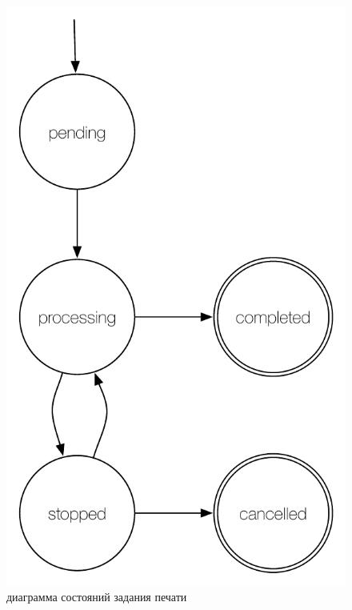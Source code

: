 \documentclass[a4paper,14pt,href,draft]{article}
\begin{document}
\begin{figure}[htbp]
\begin{center}
  \includegraphics[scale=0.65]{state-machine.pdf}
    \caption{диаграмма состояний задания печати}
    \label{fig:StateMachine}
\end{center}
\end{figure}
\end{document}
